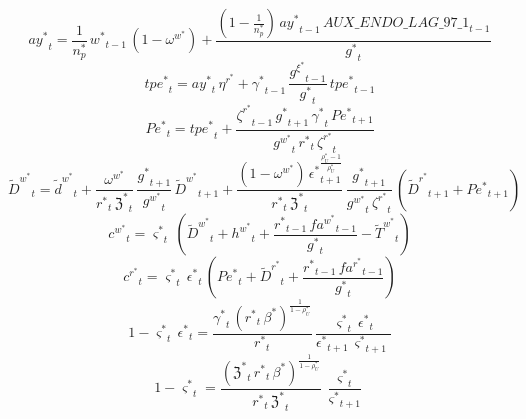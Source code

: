 \begin{dmath}
{{ay^*}}_{t}=\frac{1}{{{n_p^*}}}\, {{w^*}}_{t-1}\, \left(1-{{\omega^w^*}}\right)+\frac{\left(1-\frac{1}{{{n_p^*}}}\right)\, {{ay^*}}_{t-1}\, {AUX\_ENDO\_LAG\_97\_1}_{t-1}}{{{g^*}}_{t}}
\end{dmath}
\begin{dmath}
{{tpe^*}}_{t}={{ay^*}}_{t}\, {{\eta^r^*}}+{{\gamma^*}}_{t-1}\, \frac{{{g^{\xi}^*}}_{t-1}}{{{g^*}}_{t}}\, {{tpe^*}}_{t-1}
\end{dmath}
\begin{dmath}
{{Pe^*}}_{t}={{tpe^*}}_{t}+\frac{{{\zeta^r^*}}_{t-1}\, {{g^*}}_{t+1}\, {{\gamma^*}}_{t}\, {{Pe^*}}_{t+1}}{{{g^w^*}}_{t}\, {{r^*}}_{t}\, {{\zeta^r^*}}_{t}}
\end{dmath}
\begin{dmath}
{\tilde{D}^w^*}_{t}={\tilde{d}^w^*}_{t}+\frac{{{\omega^w^*}}}{{{r^*}}_{t}\, {{\mathfrak{Z}^*}}_{t}}\, \frac{{{g^*}}_{t+1}}{{{g^w^*}}_{t}}\, {\tilde{D}^w^*}_{t+1}+\frac{\left(1-{{\omega^w^*}}\right)\, {{\epsilon^*}}_{t+1}^{\frac{{{\rho_U^*}}-1}{{{\rho_U^*}}}}}{{{r^*}}_{t}\, {{\mathfrak{Z}^*}}_{t}}\, \frac{{{g^*}}_{t+1}}{{{g^w^*}}_{t}\, {{\zeta^r^*}}_{t}}\, \left({\tilde{D}^r^*}_{t+1}+{{Pe^*}}_{t+1}\right)
\end{dmath}
\begin{dmath}
{{c^w^*}}_{t}={{\varsigma^*}}_{t}\, \left({\tilde{D}^w^*}_{t}+{{h^w^*}}_{t}+\frac{{{r^*}}_{t-1}\, {{fa^w^*}}_{t-1}}{{{g^*}}_{t}}-{\tilde{T}^w^*}_{t}\right)
\end{dmath}
\begin{dmath}
{{c^r^*}}_{t}={{\varsigma^*}}_{t}\, {{\epsilon^*}}_{t}\, \left({{Pe^*}}_{t}+{\tilde{D}^r^*}_{t}+\frac{{{r^*}}_{t-1}\, {{fa^r^*}}_{t-1}}{{{g^*}}_{t}}\right)
\end{dmath}
\begin{dmath}
1-{{\varsigma^*}}_{t}\, {{\epsilon^*}}_{t}=\frac{{{\gamma^*}}_{t}\, \left({{r^*}}_{t}\, {{\beta^*}}\right)^{\frac{1}{1-{{\rho_U^*}}}}}{{{r^*}}_{t}}\, \frac{{{\varsigma^*}}_{t}\, {{\epsilon^*}}_{t}}{{{\epsilon^*}}_{t+1}\, {{\varsigma^*}}_{t+1}}
\end{dmath}
\begin{dmath}
1-{{\varsigma^*}}_{t}=\frac{\left({{\mathfrak{Z}^*}}_{t}\, {{r^*}}_{t}\, {{\beta^*}}\right)^{\frac{1}{1-{{\rho_U^*}}}}}{{{r^*}}_{t}\, {{\mathfrak{Z}^*}}_{t}}\, \frac{{{\varsigma^*}}_{t}}{{{\varsigma^*}}_{t+1}}
\end{dmath}
